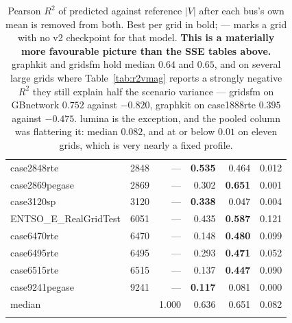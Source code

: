 \documentclass[10pt]{article}
\begin{document}
\begin{longtable}{lrrrrr}
case2848rte & 2848 & --- & \textbf{0.535} & 0.464 & 0.012 \\
case2869pegase & 2869 & --- & 0.302 & \textbf{0.651} & 0.001 \\
case3120sp & 3120 & --- & \textbf{0.338} & 0.047 & 0.004 \\
ENTSO\_E\_RealGridTest & 6051 & --- & 0.435 & \textbf{0.587} & 0.121 \\
case6470rte & 6470 & --- & 0.148 & \textbf{0.480} & 0.099 \\
case6495rte & 6495 & --- & 0.293 & \textbf{0.471} & 0.052 \\
case6515rte & 6515 & --- & 0.137 & \textbf{0.447} & 0.090 \\
case9241pegase & 9241 & --- & \textbf{0.117} & 0.081 & 0.000 \\
\midrule
median & & 1.000 & 0.636 & 0.651 & 0.082 \\
\bottomrule
\caption{Pearson $R^2$ of predicted against reference $|V|$ after each bus's
own mean is removed from both.  Best per grid in bold; \textsc{---} marks a
grid with no v2 checkpoint for that model.  \textbf{This is a materially more
favourable picture than the SSE tables above.}  graphkit and gridsfm hold
median $0.64$ and $0.65$, and on several large grids where
Table~\ref{tab:r2vmag} reports a strongly negative $R^2$ they still explain
half the scenario variance --- gridsfm on GBnetwork $0.752$ against $-0.820$,
graphkit on case1888rte $0.395$ against $-0.475$.  lumina is the exception, and
the pooled column was flattering it: median $0.082$, and at or below $0.01$ on
eleven grids, which is very nearly a fixed profile.}
\label{tab:perbusr2}
\end{longtable}
\end{document}
